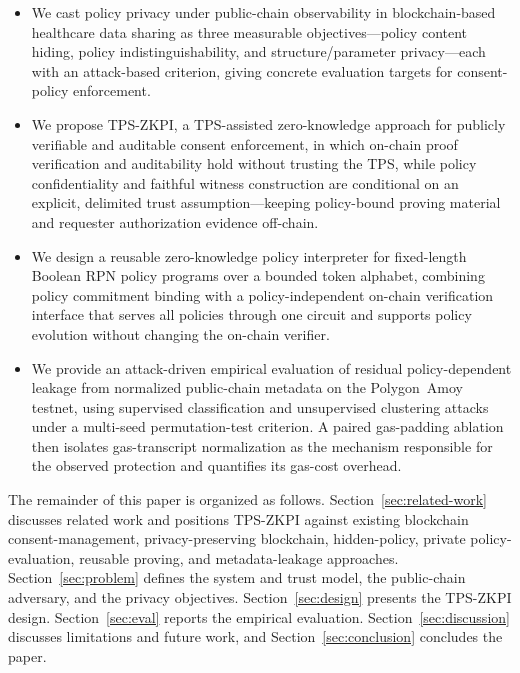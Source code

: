 \begin{itemize}
	\item We cast policy privacy under public-chain observability in blockchain-based
	      healthcare data sharing as three measurable objectives---policy content hiding,
	      policy indistinguishability, and structure/parameter privacy---each with an
	      attack-based criterion, giving concrete evaluation targets for consent-policy
	      enforcement.

	\item We propose TPS-ZKPI, a TPS-assisted zero-knowledge approach for publicly
	      verifiable and auditable consent enforcement, in which on-chain proof
	      verification and auditability hold without trusting the TPS, while policy
	      confidentiality and faithful witness construction are conditional on an
	      explicit, delimited trust assumption---keeping policy-bound proving material
	      and requester authorization evidence off-chain.

	\item We design a reusable zero-knowledge policy interpreter for fixed-length
	      Boolean RPN policy programs over a bounded token alphabet, combining policy commitment
	      binding with a policy-independent on-chain verification interface that serves all
	      policies through one circuit and supports policy evolution without changing the
	      on-chain verifier.

	\item We provide an attack-driven empirical evaluation of residual policy-dependent
	      leakage from normalized public-chain metadata on the Polygon~Amoy testnet, using
	      supervised classification and unsupervised clustering attacks under a multi-seed
	      permutation-test criterion. A paired gas-padding ablation then isolates
	      gas-transcript normalization as the mechanism responsible for the observed
	      protection and quantifies its gas-cost overhead.
\end{itemize}

The remainder of this paper is organized as follows.
Section~\ref{sec:related-work} discusses related work and positions TPS-ZKPI against existing blockchain consent-management, privacy-preserving blockchain, hidden-policy, private policy-evaluation, reusable proving, and metadata-leakage approaches.
Section~\ref{sec:problem} defines the system and trust model, the public-chain adversary, and the privacy objectives.
Section~\ref{sec:design} presents the TPS-ZKPI design.
Section~\ref{sec:eval} reports the empirical evaluation.
Section~\ref{sec:discussion} discusses limitations and future work, and
Section~\ref{sec:conclusion} concludes the paper.
